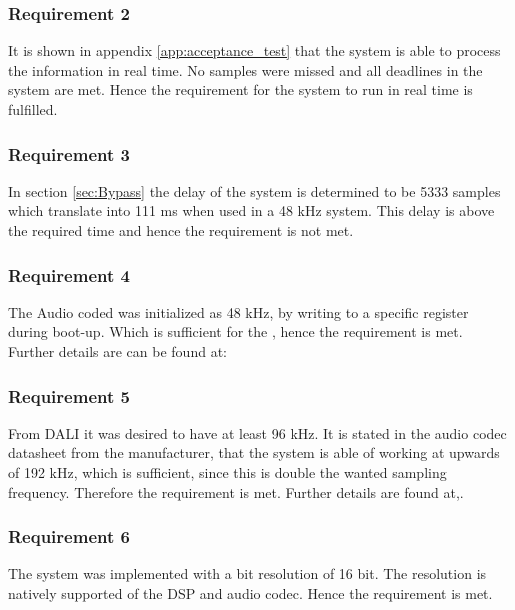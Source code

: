 \subsubsection*{Requirement 2}

It is shown in appendix \ref{app:acceptance_test} that the system is able to process the information in real time. No samples were missed and all deadlines in the system are met. Hence the requirement for the system to run in real time is fulfilled.


\subsubsection*{Requirement 3}

In section \ref{sec:Bypass} the delay of the system is determined to be 5333 samples which translate into 111 ms when used in a 48 kHz system. This delay is above the required time and hence the requirement is not met.

\subsubsection*{Requirement 4}

The Audio coded was initialized as 48 kHz, by writing to a specific register during boot-up. Which is sufficient for the , hence the requirement is met. Further details are can be found at:


\subsubsection*{Requirement 5}
From DALI it was desired to have at least 96 kHz. It is stated in the audio codec datasheet from the manufacturer, that the system is able of working at upwards of 192 kHz, which is sufficient, since this is double the wanted sampling frequency. Therefore the requirement is met. Further details are found at,.


\subsubsection*{Requirement 6}
The system was implemented with a bit resolution of 16 bit. The resolution is natively supported of the DSP and audio codec. Hence the requirement is met.

\vspace*{-5mm}
